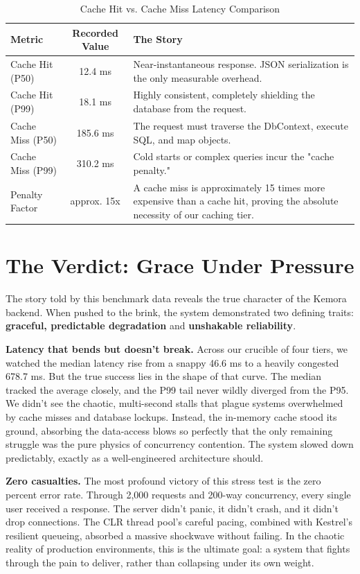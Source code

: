 \begin{table}[H]
\centering
\renewcommand{\arraystretch}{1.3}
\begin{tabular}{|l|c|p{8cm}|}
\hline
\textbf{Metric} & \textbf{Recorded Value} & \textbf{The Story} \\ \hline
Cache Hit (P50) & 12.4 ms & Near-instantaneous response. JSON serialization is the only measurable overhead. \\ \hline
Cache Hit (P99) & 18.1 ms & Highly consistent, completely shielding the database from the request. \\ \hline
Cache Miss (P50) & 185.6 ms & The request must traverse the DbContext, execute SQL, and map objects. \\ \hline
Cache Miss (P99) & 310.2 ms & Cold starts or complex queries incur the "cache penalty." \\ \hline
Penalty Factor & approx. 15x & A cache miss is approximately 15 times more expensive than a cache hit, proving the absolute necessity of our caching tier. \\ \hline
\end{tabular}
\caption{Cache Hit vs. Cache Miss Latency Comparison}
\label{tab:cache_comparison}
\end{table}

\section{The Verdict: Grace Under Pressure}
The story told by this benchmark data reveals the true character of the Kemora backend. When pushed to the brink, the system demonstrated two defining traits: \textbf{graceful, predictable degradation} and \textbf{unshakable reliability}.

\textbf{Latency that bends but doesn't break.} Across our crucible of four tiers, we watched the median latency rise from a snappy 46.6 ms to a heavily congested 678.7 ms. But the true success lies in the shape of that curve. The median tracked the average closely, and the P99 tail never wildly diverged from the P95. We didn't see the chaotic, multi-second stalls that plague systems overwhelmed by cache misses and database lockups. Instead, the in-memory cache stood its ground, absorbing the data-access blows so perfectly that the only remaining struggle was the pure physics of concurrency contention. The system slowed down predictably, exactly as a well-engineered architecture should.

\textbf{Zero casualties.} The most profound victory of this stress test is the zero percent error rate. Through 2,000 requests and 200-way concurrency, every single user received a response. The server didn't panic, it didn't crash, and it didn't drop connections. The CLR thread pool's careful pacing, combined with Kestrel's resilient queueing, absorbed a massive shockwave without failing. In the chaotic reality of production environments, this is the ultimate goal: a system that fights through the pain to deliver, rather than collapsing under its own weight.

